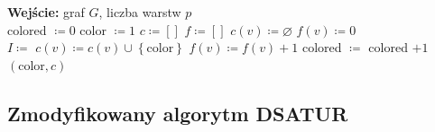 \documentclass[10pt,a4paper]{article}
\begin{document}
	\begin{algorithmic}
		\State \textbf{Wejście:} graf $G$, liczba warstw $p$
		\\
			\State colored $\coloneqq 0$
			\State color $\coloneqq 1$
			\State $c \coloneqq \left[\right]$
			\State $f \coloneqq \left[\right]$
				\State $c(v) \coloneqq \varnothing$
				\State $f(v) \coloneqq 0$
			\EndFor
			\\
				\State $I \coloneqq $ 
					\State $c(v) \coloneqq c(v) \cup \left\{ \text{color} \right\}$
					\State $f(v) \coloneqq f(v) + 1$
					\State colored $\coloneqq$ colored $ + 1$
				\EndFor
			\EndWhile
			\State \Return $(\text{color}, c)$
		\EndFunction
	\end{algorithmic}

	\subsection{Zmodyfikowany algorytm DSATUR}
	
\end{document}
